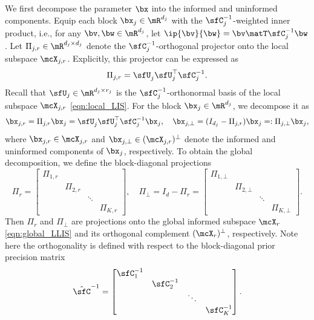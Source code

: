\documentclass[11pt]{article}
\begin{document}
We first decompose the parameter $\bx$ into the informed and uninformed components.
%
Equip each block $\bx_j \in \mR^{d_j}$ with the $\sfC_j^{-1}$-weighted inner product, i.e., for any $\bv,\bw \in \mR^{d_j}$, let $\ip{\bv}{\bw} = \bv\matT \sfC_j^{-1} \bw$.
%
Let $\Pi_{j,r} \in \mR^{d_j \times d_j}$ denote the $\sfC_j^{-1}$-orthogonal projector onto the local subspace $\mcX_{j,r}$. 
Explicitly, this projector can be expressed as
\begin{equation}
\label{eqn:local_proj}
    \Pi_{j,r} = \sfU_j^{} \sfU_j^\top \sfC_j^{-1}.
\end{equation}
Recall that $\sfU_j \in \mR^{d_j \times r_j}$ is the $\sfC_j^{-1}$-orthonormal basis of the local subspace $\mcX_{j,r}$ \eqref{eqn:local_LIS}.
For the block $\bx_j \in \mR^{d_j}$, we decompose it as
\begin{equation}
\label{eqn:block_decomp}
    \bx_{j,r} = \Pi_{j,r} \bx_j = \sfU_j^{} \sfU_j^\top \sfC_j^{-1} \bx_j , \quad \bx_{j,\bot} = ( I_{d_j} - \Pi_{j,r}) \bx_j =: \Pi_{j,\bot} \bx_j,
\end{equation}
where $\bx_{j,r} \in \mcX_{j,r}$ and $\bx_{j,\bot} \in (\mcX_{j,r})^\bot$ denote the informed and uninformed components of $\bx_j$, respectively.
%
To obtain the global decomposition, we define the block-diagonal projections
\begin{equation}
\label{eqn:global_proj}
    \Pi_r = \begin{bmatrix}
    \Pi_{1,r} & & & \\ & \Pi_{2,r} & & \\ & & \ddots & \\ & & & \Pi_{K,r}
    \end{bmatrix}, \quad \Pi_\bot = I_d - \Pi_r = \begin{bmatrix}
    \Pi_{1,\bot} & & & \\ & \Pi_{2,\bot} & & \\ & & \ddots & \\ & & & \Pi_{K,\bot}
    \end{bmatrix}.
\end{equation}
Then $\Pi_r$ and $\Pi_\bot$ are projections onto the global informed subspace $\mcX_r$ \eqref{eqn:global_LLIS} and its orthogonal complement $(\mcX_r)^\bot$, respectively. 
Note here the orthogonality is defined with respect to the block-diagonal prior precision matrix
\begin{equation}
    \hat{\sfC}^{-1} = \begin{bmatrix}
    \sfC_1^{-1} & & & \\ & \sfC_2^{-1} & & \\ & & \ddots & \\ & & & \sfC_{K}^{-1}
    \end{bmatrix}.
\end{equation}
\end{document}
